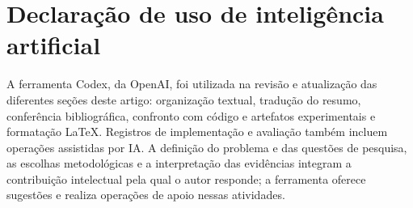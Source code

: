 \documentclass[12pt]{article}
\begin{document}
\section*{Declaração de uso de inteligência artificial}
A ferramenta Codex, da OpenAI, foi utilizada na revisão e atualização das diferentes seções deste artigo: organização textual, tradução do resumo, conferência bibliográfica, confronto com código e artefatos experimentais e formatação LaTeX. Registros de implementação e avaliação também incluem operações assistidas por IA. A definição do problema e das questões de pesquisa, as escolhas metodológicas e a interpretação das evidências integram a contribuição intelectual pela qual o autor responde; a ferramenta oferece sugestões e realiza operações de apoio nessas atividades.



\end{document}
